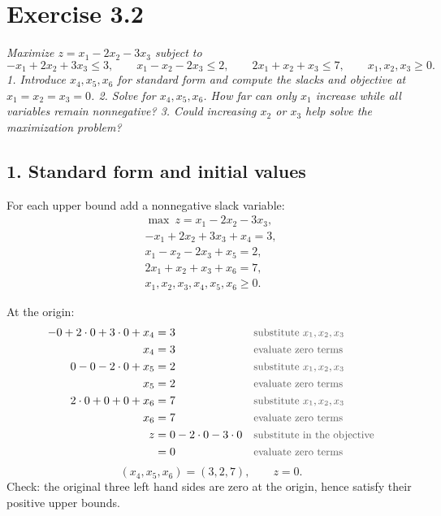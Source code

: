 \documentclass[a4paper,11pt]{article}
\newif\ifexplain
\newcommand{\aufgabe}[1]{\section*{Exercise #1}}
\newcommand{\angabe}[1]{\textit{#1}\par\smallskip}
\newcommand{\teil}[1]{\subsection*{#1}}
\newcommand{\why}[1]{\text{\small\color{black!65}#1}}
\newcommand{\explain}[1]{\ifexplain\begin{erklbox}#1\end{erklbox}\fi}
\begin{document}
\aufgabe{3.2}
\angabe{Maximize $z=x_1-2x_2-3x_3$ subject to
\[
-x_1+2x_2+3x_3\leq3,\qquad x_1-x_2-2x_3\leq2,\qquad 2x_1+x_2+x_3\leq7,
\qquad x_1,x_2,x_3\geq0.
\]
1. Introduce $x_4,x_5,x_6$ for standard form and compute the slacks and objective at $x_1=x_2=x_3=0$.
2. Solve for $x_4,x_5,x_6$. How far can only $x_1$ increase while all variables remain nonnegative?
3. Could increasing $x_2$ or $x_3$ help solve the maximization problem?}

\teil{1. Standard form and initial values}
For each upper bound add a nonnegative slack variable:
\[
\boxed{\begin{gathered}
\max\ z=x_1-2x_2-3x_3,\\
-x_1+2x_2+3x_3+x_4=3,\\
x_1-x_2-2x_3+x_5=2,\\
2x_1+x_2+x_3+x_6=7,\\
x_1,x_2,x_3,x_4,x_5,x_6\geq0.
\end{gathered}}
\]
\explain{Bei einer oberen Schranke addieren wir den fehlenden Rest zur linken Seite. Deshalb steht vor jeder Schlupfvariable ein Plus. Die Forderung $x_4,x_5,x_6\geq0$ stellt sicher, dass die ursprüngliche Schranke nicht überschritten wird. Die Zielfunktion ändert sich dadurch nicht.}
At the origin:
\begin{align*}
-0+2\cdot0+3\cdot0+x_4&=3&&\why{substitute $x_1,x_2,x_3$}\\
x_4&=3&&\why{evaluate zero terms}\\
0-0-2\cdot0+x_5&=2&&\why{substitute $x_1,x_2,x_3$}\\
x_5&=2&&\why{evaluate zero terms}\\
2\cdot0+0+0+x_6&=7&&\why{substitute $x_1,x_2,x_3$}\\
x_6&=7&&\why{evaluate zero terms}\\
z&=0-2\cdot0-3\cdot0&&\why{substitute in the objective}\\
&=0&&\why{evaluate zero terms}
\end{align*}
\[\boxed{(x_4,x_5,x_6)=(3,2,7),\qquad z=0.}\]
Check: the original three left hand sides are zero at the origin, hence satisfy their positive upper bounds.
\end{document}
